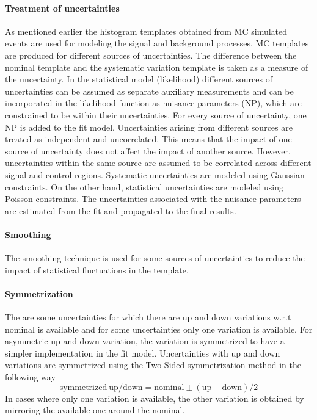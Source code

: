 \paragraph{Treatment of uncertainties} As mentioned earlier the histogram templates obtained from MC simulated events are used for modeling the signal and background processes. MC templates are produced for different sources of uncertainties. The difference between the nominal template and the systematic variation template is taken as a measure of the uncertainty. %
In the statistical model (likelihood) different sources of uncertainties can be assumed as separate auxiliary measurements and can be incorporated in the likelihood function as nuisance parameters (NP), which are constrained to be within their uncertainties. For every source of uncertainty, one NP is added to the fit model. Uncertainties arising from different sources are treated as independent and uncorrelated. This means that the impact of one source of uncertainty does not affect the impact of another source. However, uncertainties within the same source are assumed to be correlated across different signal and control regions. Systematic uncertainties are modeled using Gaussian constraints. On the other hand, statistical uncertainties are modeled using Poisson constraints. The uncertainties associated with the nuisance parameters are estimated from the fit and propagated to the final results.

\paragraph{Smoothing}The smoothing technique is used for some sources of uncertainties to reduce the impact of statistical fluctuations in the template.

\paragraph{Symmetrization}The are some uncertainties for which there are up and down variations w.r.t nominal is available and for some uncertainties only one variation is available. For asymmetric up and down variation, the variation is symmetrized to have a simpler implementation in the fit model. Uncertainties with up and down variations are symmetrized using the Two-Sided symmetrization method in the following way $$ \mathrm{symmetrized \ up/down} = \mathrm{nominal} \pm (\mathrm{up - down})/2 $$ In cases where only one variation is available, the other variation is obtained by mirroring the available one around the nominal. 

